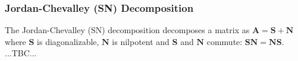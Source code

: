 

\subsubsection{Jordan-Chevalley (SN) Decomposition}
The Jordan-Chevalley (SN) decomposition decomposes a matrix as $\mathbf{A} =  \mathbf{S + N}$ where $\mathbf{S}$ is diagonalizable, $\mathbf{N}$ is nilpotent and $\mathbf{S}$ and $\mathbf{N}$ commute:
$\mathbf{SN} = \mathbf{NS}$. ...TBC...




\begin{comment}
	
Dear linear algebra students, This is what matrices (and matrix manipulation) really look like	
https://www.youtube.com/watch?v=4csuTO7UTMo	

Interpretation of matrices:

-in the context of solving linear systems of equations
 -each row gives a left-hand-side of one equation the system
 -each row defines a hyperplane, the solution of the system is the point where all
  hyperplanes intersect
 -each column represents a vector and we are looking for the coeffs to scale the 
  cols by to obtain agiven target vector on the RHS

-In the context of linear transformations:
 -the j-th column tells us where the j-th unit basis vector is mapped to
 
Maybe have sections for
-Product Decompositions

	
\end{comment}